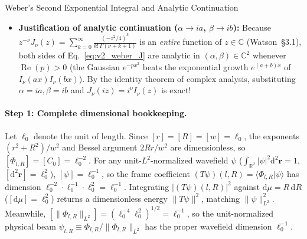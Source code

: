 \documentclass[10pt,letterpaper]{article}
\newcommand{\braket}[2]{\langle #1 | #2 \rangle}
\newcommand{\norm}[1]{\lVert #1 \rVert}
\newcommand{\abs}[1]{\lvert #1 \rvert}
\newcommand{\dd}{\mathrm{d}}
\numberwithin{equation}{section}
\begin{document}
\begin{approxbox}{Weber's Second Exponential Integral and Analytic Continuation}
\begin{itemize}[leftmargin=1.4em,itemsep=2pt,topsep=1pt]
  \[
    \text{LHS} = 2\pi \sum_{n=-\infty}^\infty e^{in(\theta_\alpha-\theta_\beta)} \int_0^\infty x\,e^{-px^2} J_n(\alpha x) J_n(\beta x)\,\dd x.
  \]
  Equating the Fourier coefficient of $e^{in(\theta_\alpha - \theta_\beta)}$ on both sides and dividing by $2\pi$ yields Eq.~\eqref{eq:v2_weber_J} identically!
  \item \textbf{Justification of analytic continuation ($\alpha \to ia$, $\beta \to ib$):} Because $z^{-\nu} J_\nu(z) = \sum_{k=0}^\infty \frac{(-z^2/4)^k}{k!\,\Gamma(\nu+k+1)}$ is an \emph{entire} function of $z \in \mathbb{C}$ (Watson~\S3.1), both sides of Eq.~\eqref{eq:v2_weber_J} are analytic in $(\alpha,\beta) \in \mathbb{C}^2$ whenever $\operatorname{Re}(p) > 0$ (the Gaussian $e^{-px^2}$ beats the exponential growth $e^{(a+b)x}$ of $I_\nu(ax)I_\nu(bx)$). By the identity theorem of complex analysis, substituting $\alpha = ia, \beta = ib$ and $J_\nu(iz) = i^\nu I_\nu(z)$ is exact!
\end{itemize}
\end{approxbox}

\paragraph*{Step 1: Complete dimensional bookkeeping.}
Let $\ell_0$ denote the unit of length. Since $[r] = [R] = [w] = \ell_0$, the exponents $(r^2+R^2)/w^2$ and Bessel argument $2Rr/w^2$ are dimensionless, so $[\Phi_{l,R}] = [C_0] = \ell_0^{-2}$. For any unit-$L^2$-normalized wavefield $\psi$ ($\int_{\mathbb{R}^2}\abs{\psi}^2\dd^2\mathbf{r} = 1$, $[\dd^2\mathbf{r}] = \ell_0^2$), $[\psi] = \ell_0^{-1}$, so the frame coefficient $(T\psi)(l,R) = \braket{\Phi_{l,R}}{\psi}$ has dimension $\ell_0^{-2}\cdot\ell_0^{-1}\cdot\ell_0^2 = \ell_0^{-1}$. Integrating $\abs{(T\psi)(l,R)}^2$ against $\dd\mu = R\,\dd R$ ($[\dd\mu] = \ell_0^2$) returns a dimensionless energy $\norm{T\psi}^2$, matching $\norm{\psi}_{L^2}^2$. Meanwhile, $[\norm{\Phi_{l,R}}_{L^2}] = (\ell_0^{-4}\ell_0^2)^{1/2} = \ell_0^{-1}$, so the unit-normalized physical beam $\psi_{l,R} \equiv \Phi_{l,R}/\norm{\Phi_{l,R}}_{L^2}$ has the proper wavefield dimension $\ell_0^{-1}$.
\end{document}
